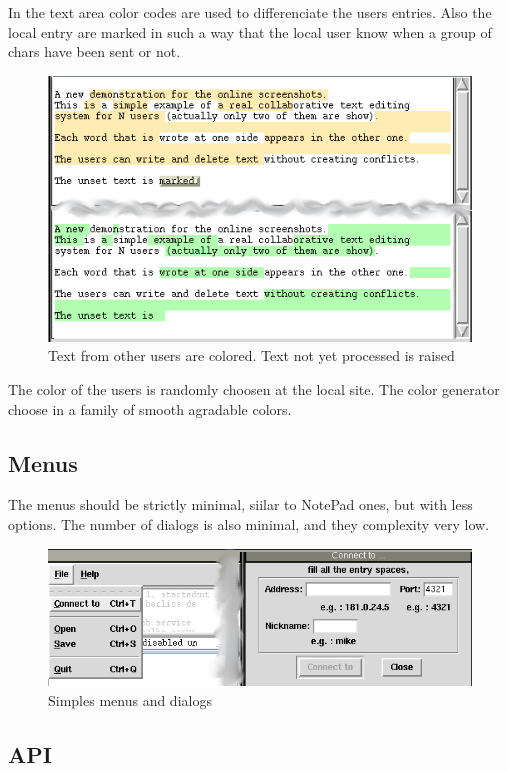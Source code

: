 \documentclass{report}
\begin{document}
In the text area color codes are used to differenciate the users entries. Also the local entry are marked in such a way that the local user know when a group of chars have been sent or not.


\begin{figure}[htbp]
 \begin{center}
    \includegraphics[angle=0,width=0.5\linewidth]{schemas/collaborating_small_shot.png}
 \end{center}
 \caption{Text from other users are colored. Text not yet processed is raised}
 \label{fig:collaboratingsmallshot}
\end{figure}


The color of the users is randomly choosen at the local site. The color generator choose in a family of smooth agradable colors. 


\subsection{Menus}

The menus should be strictly minimal, siilar to NotePad ones, but with less options.
The number of dialogs is also minimal, and they complexity very low.

\begin{figure}[htbp]
 \begin{center}
    \includegraphics[angle=0,width=0.5\linewidth]{schemas/simples_menus_and_dialogs.png}
 \end{center}
 \caption{Simples menus and dialogs}
 \label{fig:simplesmenusanddialogs}
\end{figure}


\subsection{API}
\end{document}
